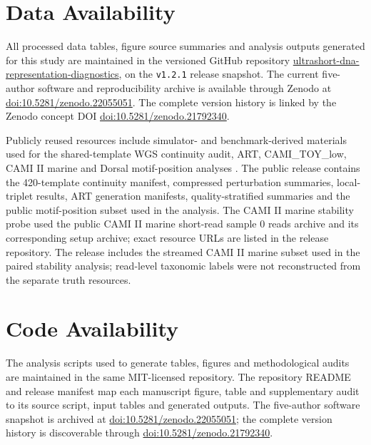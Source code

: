 \section{Data Availability}

All processed data tables, figure source summaries and analysis outputs generated for this study are maintained in the versioned GitHub repository \href{https://github.com/FairYJmrx/ultrashort-dna-representation-diagnostics/tree/v1.2.1}{ultrashort-dna-representation-diagnostics}, on the \texttt{v1.2.1} release snapshot. The current five-author software and reproducibility archive is available through Zenodo at \href{https://doi.org/10.5281/zenodo.22055051}{doi:10.5281/zenodo.22055051}. The complete version history is linked by the Zenodo concept DOI \href{https://doi.org/10.5281/zenodo.21792340}{doi:10.5281/zenodo.21792340}.

Publicly reused resources include simulator- and benchmark-derived materials used for the shared-template WGS continuity audit, ART, CAMI\_TOY\_low, CAMI II marine and Dorsal motif-position analyses \citep{Huang2012ART,Sczyrba2017,Meyer2022,CliffordAdami2016Dryad}. The public release contains the 420-template continuity manifest, compressed perturbation summaries, local-triplet results, ART generation manifests, quality-stratified summaries and the public motif-position subset used in the analysis. The CAMI II marine stability probe used the public CAMI II marine short-read sample 0 reads archive and its corresponding setup archive; exact resource URLs are listed in the release repository. The release includes the streamed CAMI II marine subset used in the paired stability analysis; read-level taxonomic labels were not reconstructed from the separate truth resources.

\FloatBarrier
\section{Code Availability}

The analysis scripts used to generate tables, figures and methodological audits are maintained in the same MIT-licensed repository. The repository README and release manifest map each manuscript figure, table and supplementary audit to its source script, input tables and generated outputs. The five-author software snapshot is archived at \href{https://doi.org/10.5281/zenodo.22055051}{doi:10.5281/zenodo.22055051}; the complete version history is discoverable through \href{https://doi.org/10.5281/zenodo.21792340}{doi:10.5281/zenodo.21792340}.

